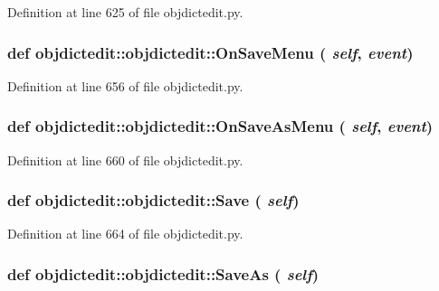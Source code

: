 Definition at line 625 of file objdictedit.py.\hypertarget{classobjdictedit_1_1objdictedit_4ec2a606f003b9428515bc47a63f549b}{
\subsubsection[OnSaveMenu]{\setlength{\rightskip}{0pt plus 5cm}def objdictedit::objdictedit::On\-Save\-Menu ( {\em self},  {\em event})}}
\label{classobjdictedit_1_1objdictedit_4ec2a606f003b9428515bc47a63f549b}




Definition at line 656 of file objdictedit.py.\hypertarget{classobjdictedit_1_1objdictedit_4120aa522383dd8fe88df46672e1464c}{
\subsubsection[OnSaveAsMenu]{\setlength{\rightskip}{0pt plus 5cm}def objdictedit::objdictedit::On\-Save\-As\-Menu ( {\em self},  {\em event})}}
\label{classobjdictedit_1_1objdictedit_4120aa522383dd8fe88df46672e1464c}




Definition at line 660 of file objdictedit.py.\hypertarget{classobjdictedit_1_1objdictedit_017884a8631f8a0bdfe3d37a941c196c}{
\subsubsection[Save]{\setlength{\rightskip}{0pt plus 5cm}def objdictedit::objdictedit::Save ( {\em self})}}
\label{classobjdictedit_1_1objdictedit_017884a8631f8a0bdfe3d37a941c196c}




Definition at line 664 of file objdictedit.py.\hypertarget{classobjdictedit_1_1objdictedit_67eeca8c238cfd33c1d8e8fb33f07a5c}{
\subsubsection[SaveAs]{\setlength{\rightskip}{0pt plus 5cm}def objdictedit::objdictedit::Save\-As ( {\em self})}}
\label{classobjdictedit_1_1objdictedit_67eeca8c238cfd33c1d8e8fb33f07a5c}




